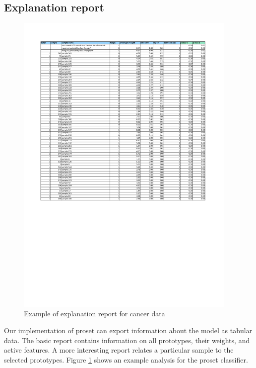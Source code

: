 \subsection{Explanation report}
\label{sec_explanation_report}
%
\begin{figure}
\caption{Example of explanation report for cancer data}
\label{fig_explanation_report}
%
\begin{center}
\includegraphics[width=0.95\textwidth, trim={1.5cm 2.0cm 1.5cm 1.5cm}, clip]{figures/cancer_2d_95_model_explain.pdf}
\end{center}
\end{figure}
%
Our implementation of proset can export information about the model as tabular data.
The basic report contains information on all prototypes, their weights, and active features.
A more interesting report relates a particular sample to the selected prototypes.
Figure \ref{fig_explanation_report} shows an example analysis for the proset classifier.
